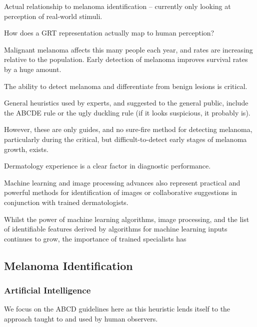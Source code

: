 \documentclass[a4paper, natbib, doc, 12pt]{apa7}
\begin{document}
Actual relationship to melanoma identification -- currently only looking at perception of real-world stimuli.

How does a GRT representation actually map to human perception?


\newpage




































Malignant melanoma affects this many people each year, and rates are increasing relative to the population. Early detection of melanoma improves survival rates by a huge amount.

The ability to detect melanoma and differentiate from benign lesions is critical. 

General heuristics used by experts, and suggested to the general public, include the ABCDE rule or the ugly duckling rule (if it looks suspicious, it probably is). 


However, these are only guides, and no sure-fire method for detecting melanoma, particularly during the critical, but difficult-to-detect early stages of melanoma growth, exists. 

Dermatology experience is a clear factor in diagnostic performance. 

Machine learning and image processing advances also represent practical and powerful methods for identification of images or collaborative suggestions in conjunction with trained dermatologists. 

Whilst the power of machine learning algorithms, image processing, and the list of identifiable features derived by algorithms for machine learning inputs continues to grow, the importance of trained specialists has

\subsection{Melanoma Identification}
\subsubsection{Artificial Intelligence}
We focus on the ABCD guidelines here as this heuristic lends itself to the approach taught to and used by human observers. 
\end{document}
